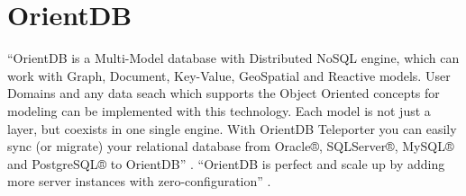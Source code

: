 \section{OrientDB}

``OrientDB is a Multi-Model database with Distributed NoSQL engine, which can work with Graph, Document, 
Key-Value, GeoSpatial and Reactive models. User Domains and any data seach which supports the Object 
Oriented concepts for modeling can be implemented with this technology. Each model is not just a layer, 
but coexists in one single engine. With OrientDB Teleporter you can easily sync (or migrate) your 
relational database from Oracle®, SQLServer®, MySQL® and PostgreSQL® to OrientDB'' \cite{OrientDB}.
``OrientDB is perfect and scale up by adding more server instances with zero-configuration'' \cite{OrientDB-cloud}.
